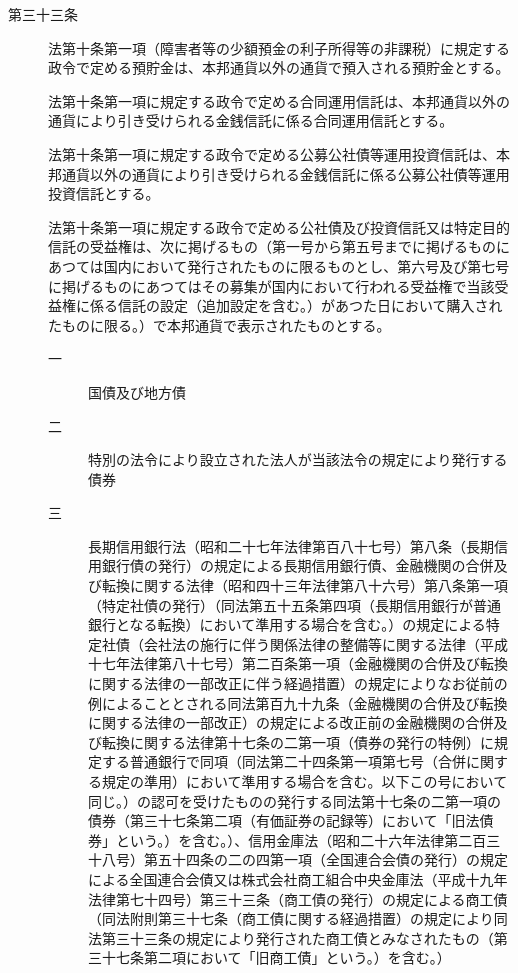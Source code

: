\documentclass[twocolumn,a4j,10pt]{ltjtarticle}
\begin{document}
\begin{description}
\item[第三十三条]法第十条第一項（障害者等の少額預金の利子所得等の非課税）に規定する政令で定める預貯金は、本邦通貨以外の通貨で預入される預貯金とする。
\item[]法第十条第一項に規定する政令で定める合同運用信託は、本邦通貨以外の通貨により引き受けられる金銭信託に係る合同運用信託とする。
\item[]法第十条第一項に規定する政令で定める公募公社債等運用投資信託は、本邦通貨以外の通貨により引き受けられる金銭信託に係る公募公社債等運用投資信託とする。
\item[]法第十条第一項に規定する政令で定める公社債及び投資信託又は特定目的信託の受益権は、次に掲げるもの（第一号から第五号までに掲げるものにあつては国内において発行されたものに限るものとし、第六号及び第七号に掲げるものにあつてはその募集が国内において行われる受益権で当該受益権に係る信託の設定（追加設定を含む。）があつた日において購入されたものに限る。）で本邦通貨で表示されたものとする。
\begin{description}
\item[一]国債及び地方債
\item[二]特別の法令により設立された法人が当該法令の規定により発行する債券
\item[三]長期信用銀行法（昭和二十七年法律第百八十七号）第八条（長期信用銀行債の発行）の規定による長期信用銀行債、金融機関の合併及び転換に関する法律（昭和四十三年法律第八十六号）第八条第一項（特定社債の発行）（同法第五十五条第四項（長期信用銀行が普通銀行となる転換）において準用する場合を含む。）の規定による特定社債（会社法の施行に伴う関係法律の整備等に関する法律（平成十七年法律第八十七号）第二百条第一項（金融機関の合併及び転換に関する法律の一部改正に伴う経過措置）の規定によりなお従前の例によることとされる同法第百九十九条（金融機関の合併及び転換に関する法律の一部改正）の規定による改正前の金融機関の合併及び転換に関する法律第十七条の二第一項（債券の発行の特例）に規定する普通銀行で同項（同法第二十四条第一項第七号（合併に関する規定の準用）において準用する場合を含む。以下この号において同じ。）の認可を受けたものの発行する同法第十七条の二第一項の債券（第三十七条第二項（有価証券の記録等）において「旧法債券」という。）を含む。）、信用金庫法（昭和二十六年法律第二百三十八号）第五十四条の二の四第一項（全国連合会債の発行）の規定による全国連合会債又は株式会社商工組合中央金庫法（平成十九年法律第七十四号）第三十三条（商工債の発行）の規定による商工債（同法附則第三十七条（商工債に関する経過措置）の規定により同法第三十三条の規定により発行された商工債とみなされたもの（第三十七条第二項において「旧商工債」という。）を含む。）

\end{description}
\end{description}
\end{document}
